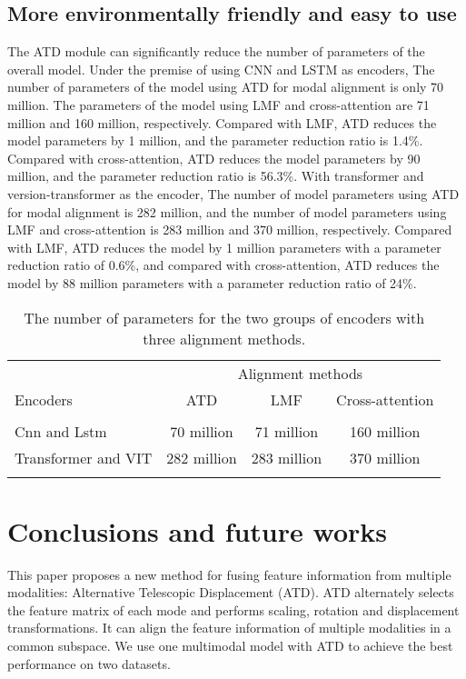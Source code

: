 \documentclass{ecai}
\begin{document}
\subsection{More environmentally friendly and easy to use}
The ATD module can significantly reduce the number of parameters of the overall model. Under the premise of using CNN and LSTM as encoders, The number of parameters of the model using ATD for modal alignment is only 70 million. The parameters of the model using LMF and cross-attention are 71 million and 160 million, respectively. Compared with LMF, ATD reduces the model parameters by 1 million, and the parameter reduction ratio is 1.4\%. Compared with cross-attention, ATD reduces the model parameters by 90 million, and the parameter reduction ratio is 56.3\%. With transformer and version-transformer as the encoder, The number of model parameters using ATD for modal alignment is 282 million, and the number of model parameters using LMF and cross-attention is 283 million and 370 million, respectively. Compared with LMF, ATD reduces the model by 1 million parameters with a parameter reduction ratio of 0.6\%, and compared with cross-attention, ATD reduces the model by 88 million parameters with a parameter reduction ratio of 24\%.
\begin{table}
\begin{center}
{\caption{The number of parameters for the two groups of encoders with three alignment methods.}\label{table3}}
\begin{tabular}{lccc}
\hline
\rule{0pt}{12pt}
&\multicolumn{3}{c}{Alignment methods}\\
\cline{2-4}
\rule{0pt}{12pt}
Encoders &ATD &LMF &Cross-attention
\\
\hline
\\[-6pt]
\quad Cnn and Lstm & 70 million & 71 million & 160 million\\

\quad Transformer and VIT  & 282 million  & 283 million & 370 million\\
\hline
\\[-6pt]

\end{tabular}
\end{center}
\end{table}


\section{Conclusions and future works}
This paper proposes a new method for fusing feature information from multiple modalities: Alternative Telescopic Displacement (ATD). ATD alternately selects the feature matrix of each mode and performs scaling, rotation and displacement transformations. It can align the feature information of multiple modalities in a common subspace. We use one multimodal model with ATD to achieve the best performance on two datasets.
\end{document}
